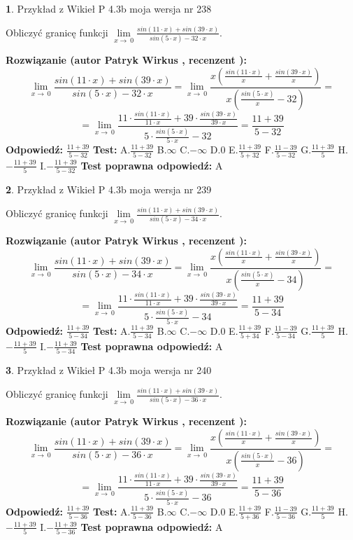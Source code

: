 \documentclass[12pt, a4paper]{article}
\theoremstyle{definition} %
\newtheorem{zad}{}
\newcommand{\zadStart}[1]{\begin{zad}#1\newline}
\newcommand{\zadStop}{\end{zad}}
\newcommand{\rozwStart}[2]{\noindent \textbf{Rozwiązanie (autor #1 , recenzent #2): }\newline}
\newcommand{\rozwStop}{\newline}
\newcommand{\odpStart}{\noindent \textbf{Odpowiedź:}\newline}
\newcommand{\odpStop}{\newline}
\newcommand{\testStart}{\noindent \textbf{Test:}\newline}
\newcommand{\testStop}{\newline}
\newcommand{\kluczStart}{\noindent \textbf{Test poprawna odpowiedź:}\newline}
\newcommand{\kluczStop}{\newline}
\begin{document}
\zadStart{Przykład z Wikieł P 4.3b moja wersja nr 238}


Obliczyć granicę funkcji $\lim\limits_{x\to\ 0}\frac{sin(11 \cdot x)+sin(39 \cdot x)}{sin(5 \cdot x)-32 \cdot x}$.
\zadStop
\rozwStart{Patryk Wirkus}{}
$$\lim\limits_{x\to\ 0}\frac{sin(11 \cdot x)+sin(39 \cdot x)}{sin(5 \cdot x)-32 \cdot x}=\lim\limits_{x\to\ 0}\frac{x(\frac{sin(11 \cdot x)}{x}+\frac{sin(39 \cdot x)}{x})}{x(\frac{sin(5 \cdot x)}{x}-32)}=$$
$$=\lim\limits_{x\to\ 0}\frac{11 \cdot \frac{sin(11 \cdot x)}{11 \cdot x}+39 \cdot \frac{sin(39 \cdot x)}{39 \cdot x}}{5 \cdot \frac{sin(5 \cdot x)}{5 \cdot x}-32}=\frac{11+39}{5-32}$$
\rozwStop
\odpStart
$\frac{11+39}{5-32}$
\odpStop
\testStart
A.$\frac{11+39}{5-32}$
B.$\infty$
C.$-\infty$
D.$0$
E.$\frac{11+39}{5+32}$
F.$\frac{11-39}{5-32}$
G.$\frac{11+39}{5}$
H.$-\frac{11+39}{5}$
I.$-\frac{11+39}{5-32}$
\testStop
\kluczStart
A
\kluczStop



\zadStart{Przykład z Wikieł P 4.3b moja wersja nr 239}


Obliczyć granicę funkcji $\lim\limits_{x\to\ 0}\frac{sin(11 \cdot x)+sin(39 \cdot x)}{sin(5 \cdot x)-34 \cdot x}$.
\zadStop
\rozwStart{Patryk Wirkus}{}
$$\lim\limits_{x\to\ 0}\frac{sin(11 \cdot x)+sin(39 \cdot x)}{sin(5 \cdot x)-34 \cdot x}=\lim\limits_{x\to\ 0}\frac{x(\frac{sin(11 \cdot x)}{x}+\frac{sin(39 \cdot x)}{x})}{x(\frac{sin(5 \cdot x)}{x}-34)}=$$
$$=\lim\limits_{x\to\ 0}\frac{11 \cdot \frac{sin(11 \cdot x)}{11 \cdot x}+39 \cdot \frac{sin(39 \cdot x)}{39 \cdot x}}{5 \cdot \frac{sin(5 \cdot x)}{5 \cdot x}-34}=\frac{11+39}{5-34}$$
\rozwStop
\odpStart
$\frac{11+39}{5-34}$
\odpStop
\testStart
A.$\frac{11+39}{5-34}$
B.$\infty$
C.$-\infty$
D.$0$
E.$\frac{11+39}{5+34}$
F.$\frac{11-39}{5-34}$
G.$\frac{11+39}{5}$
H.$-\frac{11+39}{5}$
I.$-\frac{11+39}{5-34}$
\testStop
\kluczStart
A
\kluczStop



\zadStart{Przykład z Wikieł P 4.3b moja wersja nr 240}


Obliczyć granicę funkcji $\lim\limits_{x\to\ 0}\frac{sin(11 \cdot x)+sin(39 \cdot x)}{sin(5 \cdot x)-36 \cdot x}$.
\zadStop
\rozwStart{Patryk Wirkus}{}
$$\lim\limits_{x\to\ 0}\frac{sin(11 \cdot x)+sin(39 \cdot x)}{sin(5 \cdot x)-36 \cdot x}=\lim\limits_{x\to\ 0}\frac{x(\frac{sin(11 \cdot x)}{x}+\frac{sin(39 \cdot x)}{x})}{x(\frac{sin(5 \cdot x)}{x}-36)}=$$
$$=\lim\limits_{x\to\ 0}\frac{11 \cdot \frac{sin(11 \cdot x)}{11 \cdot x}+39 \cdot \frac{sin(39 \cdot x)}{39 \cdot x}}{5 \cdot \frac{sin(5 \cdot x)}{5 \cdot x}-36}=\frac{11+39}{5-36}$$
\rozwStop
\odpStart
$\frac{11+39}{5-36}$
\odpStop
\testStart
A.$\frac{11+39}{5-36}$
B.$\infty$
C.$-\infty$
D.$0$
E.$\frac{11+39}{5+36}$
F.$\frac{11-39}{5-36}$
G.$\frac{11+39}{5}$
H.$-\frac{11+39}{5}$
I.$-\frac{11+39}{5-36}$
\testStop
\kluczStart
A
\kluczStop
\end{document}
